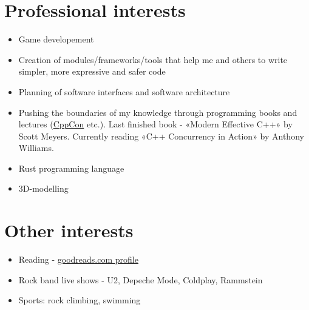 \documentclass[a4paper, 11pt]{article}
\begin{document}
\section{Professional interests}
\begin{itemize}
    \item   Game developement
    \item   Creation of modules/frameworks/tools that help me and others
            to write simpler, more expressive and safer code
    \item   Planning of software interfaces and software architecture
    \item   Pushing the boundaries of my knowledge through programming books
            and lectures (\href{http://cppcon.org/}{CppCon} etc.). Last finished book - «Modern
            Effective C++» by Scott Meyers. Currently reading «C++ Concurrency in
            Action» by Anthony Williams.
    \item   Rust programming language
    \item   3D-modelling
\end{itemize}

\section{Other interests}
\begin{itemize}
    \item   Reading -
            \href{https://www.goodreads.com/user/show/29629010-sergey-nikitin}{goodreads.com profile}
    \item   Rock band live shows - U2, Depeche Mode, Coldplay, Rammstein
    \item   Sports: rock climbing, swimming
\end{itemize}
\end{document}
